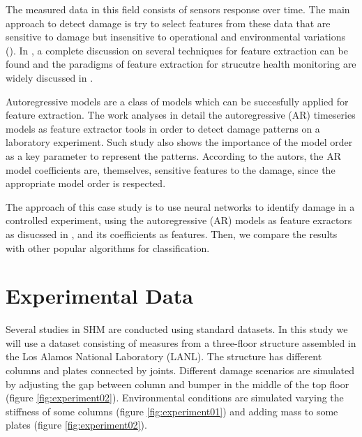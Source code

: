 \documentclass[twocolumn]{article}
\begin{document}
The measured data in this field consists of sensors response over time. The main approach to detect damage is try to select features from these data that are sensitive to damage but insensitive to operational and environmental variations (\cite{autoreg}). In \cite{report_dataset}, a complete discussion on several techniques for feature extraction can be found and the paradigms of feature extraction for strucutre health monitoring are widely discussed in \cite{axioms}.

Autoregressive models are a class of models which can be succesfully applied for feature extraction. The work \cite{autoreg} analyses in detail the autoregressive (AR) timeseries models as feature extractor tools in order to detect damage patterns on a laboratory experiment. Such study also shows the importance of the model order as a key parameter to represent the patterns. According to the autors, the AR model coefficients are, themselves, sensitive features to the damage, since the appropriate model order is respected.

The approach of this case study is to use neural networks to identify damage in a controlled experiment, using the autoregressive (AR) models as feature exractors as disucssed in \cite{autoreg}, and its coefficients as features. Then, we compare the results with other popular algorithms for classification.


\section{Experimental Data}

Several studies in SHM are conducted using standard datasets. In this study we will use a dataset consisting of measures from a three-floor structure assembled in the Los Alamos National Laboratory (LANL). The structure has different columns and plates connected by joints. Different damage scenarios are simulated by adjusting the gap between column and bumper in the middle of the top floor (figure \ref{fig:experiment02}). Environmental conditions are simulated varying the stiffness of some columns (figure \ref{fig:experiment01}) and adding mass to some plates (figure \ref{fig:experiment02}).
\end{document}
